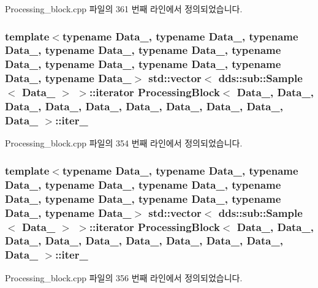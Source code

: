 Processing\+\_\+block.\+cpp 파일의 361 번째 라인에서 정의되었습니다.

\subsubsection[{\texorpdfstring{iter\+\_\+1}{iter_1}}]{\setlength{\rightskip}{0pt plus 5cm}template$<$typename Data\+\_, typename Data\+\_, typename Data\+\_, typename Data\+\_, typename Data\+\_, typename Data\+\_, typename Data\+\_, typename Data\+\_, typename Data\+\_, typename Data\+\_$>$ std\+::vector$<$ dds\+::sub\+::\+Sample$<$ Data\+\_ $>$ $>$\+::iterator {\bf Processing\+Block}$<$ Data\+\_, Data\+\_, Data\+\_, Data\+\_, Data\+\_, Data\+\_, Data\+\_, Data\+\_, Data\+\_, Data\+\_ $>$\+::iter\+\_}\hypertarget{classProcessingBlock_a397865ace617730af3b9e0bdf73e2d03}{}\label{classProcessingBlock_a397865ace617730af3b9e0bdf73e2d03}


Processing\+\_\+block.\+cpp 파일의 354 번째 라인에서 정의되었습니다.

\subsubsection[{\texorpdfstring{iter\+\_\+2}{iter_2}}]{\setlength{\rightskip}{0pt plus 5cm}template$<$typename Data\+\_, typename Data\+\_, typename Data\+\_, typename Data\+\_, typename Data\+\_, typename Data\+\_, typename Data\+\_, typename Data\+\_, typename Data\+\_, typename Data\+\_$>$ std\+::vector$<$ dds\+::sub\+::\+Sample$<$ Data\+\_ $>$ $>$\+::iterator {\bf Processing\+Block}$<$ Data\+\_, Data\+\_, Data\+\_, Data\+\_, Data\+\_, Data\+\_, Data\+\_, Data\+\_, Data\+\_, Data\+\_ $>$\+::iter\+\_}\hypertarget{classProcessingBlock_a3ccac18e84f70c0bc7fd95b025b38b99}{}\label{classProcessingBlock_a3ccac18e84f70c0bc7fd95b025b38b99}


Processing\+\_\+block.\+cpp 파일의 356 번째 라인에서 정의되었습니다.

